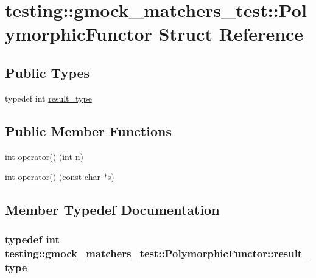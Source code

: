 \hypertarget{structtesting_1_1gmock__matchers__test_1_1PolymorphicFunctor}{}\section{testing\+:\+:gmock\+\_\+matchers\+\_\+test\+:\+:Polymorphic\+Functor Struct Reference}
\label{structtesting_1_1gmock__matchers__test_1_1PolymorphicFunctor}
\subsection*{Public Types}
\begin{DoxyCompactItemize}
\item 
typedef int \hyperlink{structtesting_1_1gmock__matchers__test_1_1PolymorphicFunctor_ae2b921ecae158b5eaa11a29ac6fe0cf3}{result\+\_\+type}
\end{DoxyCompactItemize}
\subsection*{Public Member Functions}
\begin{DoxyCompactItemize}
\item 
int \hyperlink{structtesting_1_1gmock__matchers__test_1_1PolymorphicFunctor_a2fb8b012acd2ccd52788231036877c98}{operator()} (int \hyperlink{app_2main_8cpp_acfc02ec89670db29251fda6a66602ce2}{n})
\item 
int \hyperlink{structtesting_1_1gmock__matchers__test_1_1PolymorphicFunctor_aee4d200c7f85ce4d8048d1798a511002}{operator()} (const char $\ast$s)
\end{DoxyCompactItemize}


\subsection{Member Typedef Documentation}
\subsubsection[{\texorpdfstring{result\+\_\+type}{result_type}}]{\setlength{\rightskip}{0pt plus 5cm}typedef int {\bf testing\+::gmock\+\_\+matchers\+\_\+test\+::\+Polymorphic\+Functor\+::result\+\_\+type}}\hypertarget{structtesting_1_1gmock__matchers__test_1_1PolymorphicFunctor_ae2b921ecae158b5eaa11a29ac6fe0cf3}{}\label{structtesting_1_1gmock__matchers__test_1_1PolymorphicFunctor_ae2b921ecae158b5eaa11a29ac6fe0cf3}


